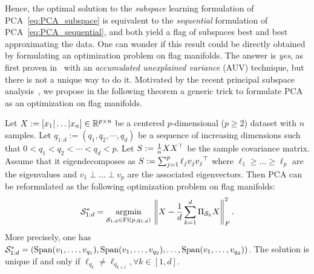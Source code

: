 Hence, the optimal solution to the \textit{subspace} learning formulation of PCA~\eqref{eq:PCA_subspace} is equivalent to the \textit{sequential} formulation of PCA~\eqref{eq:PCA_sequential}, and both yield a flag of subspaces best and best approximating the data. One can wonder if this result could be directly obtained by formulating an optimization problem on flag manifolds. The answer is \textit{yes}, as first proven in~\citet[Theorem~9]{pennec_barycentric_2018} with an \textit{accumulated unexplained variance} (AUV) technique, but there is not a unique way to do it. Motivated by the recent principal subspace analysis~\citep{szwagier_curse_2024}, we propose in the following theorem a generic trick to formulate PCA as an optimization on flag manifolds.
\begin{theorem}\label{thm:flag_trick}
	Let $X := [x_1|\dots|x_n]\in\mathbb{R}^{p\times n}$ be a centered $p$-dimensional ($p \geq 2$) dataset with $n$ samples. Let $q_{1:d} := (q_1, q_2 ,\cdots, q_d)$ be a sequence of increasing dimensions such that $0 < q_1 < q_2 < \cdots < q_d < p$.
	Let $S := \frac 1 n X X^\top$ be the sample covariance matrix. Assume that it eigendecomposes as $S := \sum_{j=1}^p \ell_j v_j {v_j}^\top$ where $\ell_1 \geq \dots \geq \ell_p$ are the eigenvalues and $v_1 \perp \dots \perp v_p$ are the associated eigenvectors.
	Then PCA can be reformulated as the following optimization problem on flag manifolds:
	\begin{equation}
		{\mathcal{S}_{1:d}^*} = \underset{\mathcal{S}_{1:d} \in \operatorname{Fl}(p, q_{1:d})}{\operatorname{argmin}} \, \left\lVert X - \frac 1 d \sum_{k=1}^d \Pi_{\mathcal{S}_k} X\right\rVert_F^2.
	\end{equation}
	More precisely, one has ${\mathcal{S}_{1:d}^*} = \left(\operatorname{Span}(v_1, \dots, v_{q_1}), \operatorname{Span}(v_1, \dots, v_{q_2}), \dots, \operatorname{Span}(v_1, \dots, v_{q_d})\right)$.
	The solution is unique if and only if $\ell_{q_k} \neq \ell_{q_{k+1}}, \forall k\in[1, d]$.
\end{theorem}
